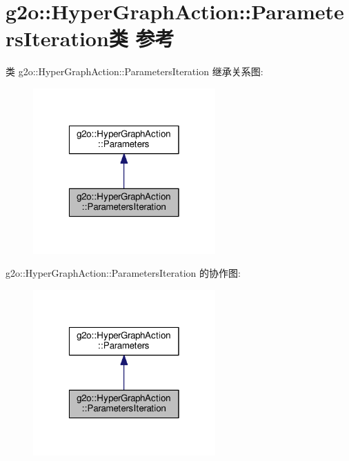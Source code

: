 \hypertarget{classg2o_1_1HyperGraphAction_1_1ParametersIteration}{\section{g2o\-:\-:Hyper\-Graph\-Action\-:\-:Parameters\-Iteration类 参考}
\label{classg2o_1_1HyperGraphAction_1_1ParametersIteration}
}


类 g2o\-:\-:Hyper\-Graph\-Action\-:\-:Parameters\-Iteration 继承关系图\-:
\nopagebreak
\begin{figure}[H]
\begin{center}
\leavevmode
\includegraphics[width=198pt]{classg2o_1_1HyperGraphAction_1_1ParametersIteration__inherit__graph}
\end{center}
\end{figure}


g2o\-:\-:Hyper\-Graph\-Action\-:\-:Parameters\-Iteration 的协作图\-:
\nopagebreak
\begin{figure}[H]
\begin{center}
\leavevmode
\includegraphics[width=198pt]{classg2o_1_1HyperGraphAction_1_1ParametersIteration__coll__graph}
\end{center}
\end{figure}
